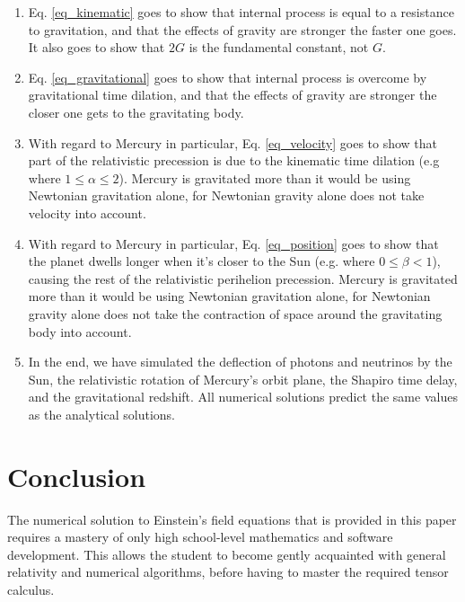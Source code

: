 \documentclass[12pt]{article}
\begin{document}
\begin{enumerate}
\item
Eq. \ref{eq_kinematic} goes to show that internal process is equal to a resistance to gravitation, and that the effects of gravity are stronger the faster one goes.
It also goes to show that $2G$ is the fundamental constant, not $G$.

\item
Eq. \ref{eq_gravitational} goes to show that internal process is overcome by gravitational time dilation, and that the effects of gravity are stronger the closer one gets to the gravitating body.

\item
With regard to Mercury in particular, Eq. \ref{eq_velocity} goes to show that part of the relativistic precession is due to the kinematic time dilation (e.g where $1 \leq \alpha \leq 2$). 
Mercury is gravitated more than it would be using Newtonian gravitation alone, for Newtonian gravity alone does not take velocity into account.

\item
With regard to Mercury in particular, Eq. \ref{eq_position} goes to show that the planet dwells longer when it's closer to the Sun (e.g. where $0 \leq \beta < 1$), causing the rest of the relativistic perihelion precession. 
Mercury is gravitated more than it would be using Newtonian gravitation alone, for Newtonian gravity alone does not take the contraction of space around the gravitating body into account.

\item
In the end, we have simulated the deflection of photons and neutrinos by the Sun, the relativistic rotation of Mercury's orbit plane, the Shapiro time delay, and the gravitational redshift.
All numerical solutions predict the same values as the analytical solutions.

\end{enumerate}






\section{Conclusion}

The numerical solution to Einstein's field equations that is provided in this paper requires a mastery of only high school-level mathematics and software development.
This allows the student to become gently acquainted with general relativity and numerical algorithms, before having to master the required tensor calculus.
\end{document}
